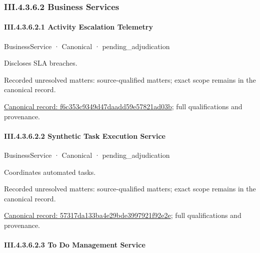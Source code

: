 \subsubsection*{III.4.3.6.2 Business Services}
\label{navigation:III.4.3.6.2}

\paragraph*{III.4.3.6.2.1 Activity Escalation Telemetry}
\label{navigation:III.4.3.6.2.1}

\label{element:f6c353c9349d47daadd59e57821ad03b}
{\small BusinessService · Canonical · pending\_adjudication}\par

Discloses SLA breaches.


{\small Recorded unresolved matters: source-qualified matters; exact scope remains in the canonical record.}\par
{\footnotesize \href{../../../../../../../continuum/business/business-service/f6c353c9349d47daadd59e57821ad03b.md}{Canonical record: f6c353c9349d47daadd59e57821ad03b}; full qualifications and provenance.}\par
\paragraph*{III.4.3.6.2.2 Synthetic Task Execution Service}
\label{navigation:III.4.3.6.2.2}

\label{element:57317da133ba4e29bde3997921f92e2e}
{\small BusinessService · Canonical · pending\_adjudication}\par

Coordinates automated tasks.


{\small Recorded unresolved matters: source-qualified matters; exact scope remains in the canonical record.}\par
{\footnotesize \href{../../../../../../../continuum/business/business-service/57317da133ba4e29bde3997921f92e2e.md}{Canonical record: 57317da133ba4e29bde3997921f92e2e}; full qualifications and provenance.}\par
\paragraph*{III.4.3.6.2.3 To Do Management Service}
\label{navigation:III.4.3.6.2.3}

